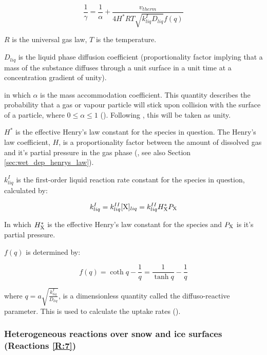 \begin{equation}
    \frac{1}{\gamma} = \frac{1}{\alpha}+ \frac{v_{therm}}{4H^*RT\sqrt{k_{liq}^ID_{liq}}f(q)}
    \label{eq:upt_coeff}
\end{equation}

\medskip

$R$ is the universal gas law, $T$ is the temperature.

\medskip

$D_{liq}$ is the liquid phase diffusion coefficient (proportionality factor implying that a mass of the substance diffuses through a unit surface in a unit time at a concentration gradient of unity). 

\medskip

in which $\alpha$ is the mass accommodation coefficient. This quantity describes the probability that a gas or vapour particle will stick upon collision with the surface of a particle, where $0\leq\alpha\leq1$ (\cite{SeinfeldSpyros}). Following \cite{CAO}, this will be taken as unity. 

\medskip

$H^*$ is the effective Henry's law constant for the species in question. The Henry's law coefficient, $H$, is a proportionality factor between the amount of dissolved gas and it's partial pressure in the gas phase (\cite{Sander2015}, see also Section \ref{sec:wet_dep_henrys_law}).  

$k_{liq}^I$ is the first-order liquid reaction rate constant for the species in question, calculated by: 

\begin{equation}
    k_{liq}^I = k_{liq}^{II}[\mathrm{X}]_{liq}= k_{liq}^{II}H^*_{\mathrm{X}}P_{\mathrm{X}}
\end{equation}

In which $H^*_{\mathrm{X}}$ is the effective Henry's law constant for the species and $P_{\mathrm{X}}$ is it's partial pressure.

\medskip

$f(q)$ is determined by: 

\begin{equation}
    f(q) = \coth{q} -\frac{1}{q} = \frac{1}{\tanh{q}} -\frac{1}{q}
\end{equation}

where $q = a\sqrt{\frac{k_{liq}^I}{D_{liq}}}$, is a dimensionless quantity called the diffuso-reactive parameter. This is used to calculate the uptake rates (\cite{Hanson1994}). 


\subsubsection{Heterogeneous reactions over snow and ice surfaces (Reactions \ref{R:7})}\label{sec:snow_ice_react}


